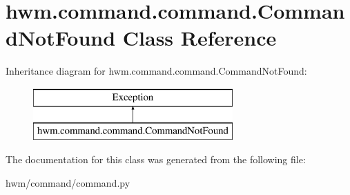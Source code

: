 \hypertarget{classhwm_1_1command_1_1command_1_1_command_not_found}{\section{hwm.\-command.\-command.\-Command\-Not\-Found Class Reference}
\label{classhwm_1_1command_1_1command_1_1_command_not_found}
}
Inheritance diagram for hwm.\-command.\-command.\-Command\-Not\-Found\-:\begin{figure}[H]
\begin{center}
\leavevmode
\includegraphics[height=2.000000cm]{classhwm_1_1command_1_1command_1_1_command_not_found}
\end{center}
\end{figure}


The documentation for this class was generated from the following file\-:\begin{DoxyCompactItemize}
\item 
hwm/command/command.\-py\end{DoxyCompactItemize}
